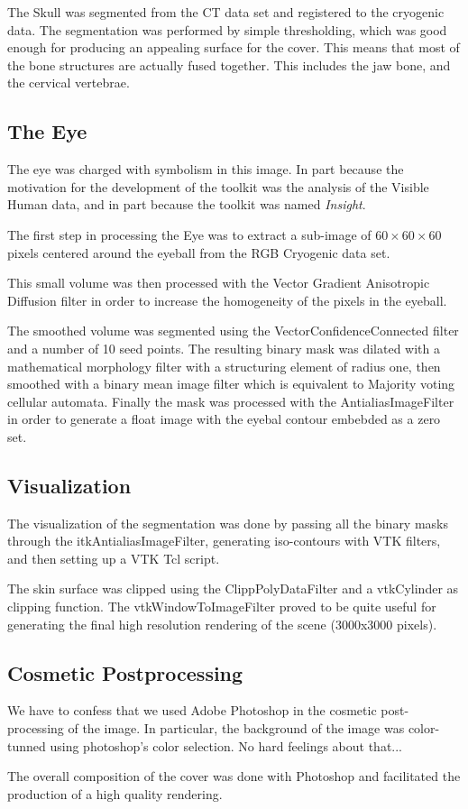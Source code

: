 The Skull was segmented from the CT data set and registered to the cryogenic
data. The segmentation was performed by simple thresholding, which was good
enough for producing an appealing surface for the cover. This means that most
of the bone structures are actually fused together. This includes the jaw bone,
and the cervical vertebrae.

\subsection*{The Eye} 

The eye was charged with symbolism in this image. In part because the
motivation for the development of the toolkit was the analysis of the Visible
Human data, and in part because the toolkit was named \emph{Insight}.

The first step in processing the Eye was to extract a sub-image of
$60\times60\times60$ pixels centered around the eyeball from the RGB Cryogenic
data set.

This small volume was then processed with the Vector Gradient Anisotropic
Diffusion filter in order to increase the homogeneity of the pixels in the 
eyeball.

The smoothed volume was segmented using the VectorConfidenceConnected filter
and a number of 10 seed points. The resulting binary mask was dilated with 
a mathematical morphology filter with a structuring element of radius one, then
smoothed with a binary mean image filter which is equivalent to Majority voting
cellular automata. Finally the mask was processed with the AntialiasImageFilter
in order to generate a float image with the eyebal contour embebded as a zero
set.


\subsection*{Visualization}

The visualization of the segmentation was done by passing all the binary masks
through the itkAntialiasImageFilter, generating iso-contours with VTK filters,
and then setting up a VTK Tcl script.

The skin surface was clipped using the ClippPolyDataFilter and a vtkCylinder
as clipping function. The vtkWindowToImageFilter proved to be quite useful for
generating the final high resolution rendering of the scene (3000x3000 pixels).


\subsection*{Cosmetic Postprocessing}

We have to confess that we used Adobe Photoshop in the cosmetic post-processing of
the image. In particular, the background of the image was color-tunned using
photoshop's color selection. No hard feelings about that...

The overall composition of the cover was done with Photoshop and facilitated
the production of a high quality rendering.

